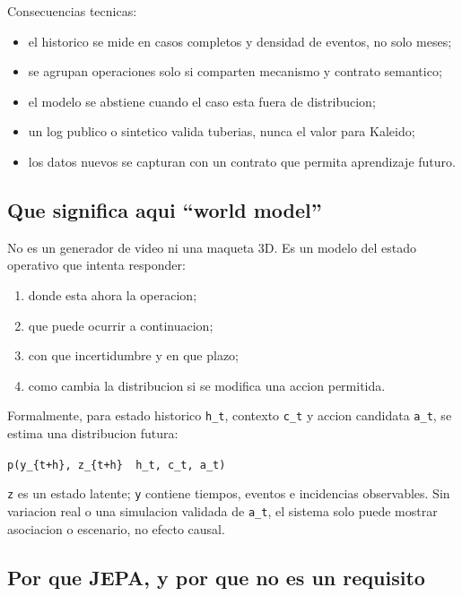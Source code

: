 \documentclass[
  spanish,
  10pt,
  a4paper,
]{article}
\providecommand{\tightlist}{%
  \setlength{\itemsep}{0pt}\setlength{\parskip}{0pt}}
\begin{document}
Consecuencias tecnicas:

\begin{itemize}
\tightlist
\item
  el historico se mide en casos completos y densidad de eventos, no solo
  meses;
\item
  se agrupan operaciones solo si comparten mecanismo y contrato
  semantico;
\item
  el modelo se abstiene cuando el caso esta fuera de distribucion;
\item
  un log publico o sintetico valida tuberias, nunca el valor para
  Kaleido;
\item
  los datos nuevos se capturan con un contrato que permita aprendizaje
  futuro.
\end{itemize}

\subsection{Que significa aqui ``world
model''}\label{que-significa-aqui-world-model}

No es un generador de video ni una maqueta 3D. Es un modelo del estado
operativo que intenta responder:

\begin{enumerate}
\def\labelenumi{\arabic{enumi}.}
\tightlist
\item
  donde esta ahora la operacion;
\item
  que puede ocurrir a continuacion;
\item
  con que incertidumbre y en que plazo;
\item
  como cambia la distribucion si se modifica una accion permitida.
\end{enumerate}

Formalmente, para estado historico \texttt{h\_t}, contexto \texttt{c\_t}
y accion candidata \texttt{a\_t}, se estima una distribucion futura:

\texttt{p(y\_\{t+h\},\ z\_\{t+h\}\ \textbar{}\ h\_t,\ c\_t,\ a\_t)}

\texttt{z} es un estado latente; \texttt{y} contiene tiempos, eventos e
incidencias observables. Sin variacion real o una simulacion validada de
\texttt{a\_t}, el sistema solo puede mostrar asociacion o escenario, no
efecto causal.

\subsection{Por que JEPA, y por que no es un
requisito}\label{por-que-jepa-y-por-que-no-es-un-requisito}
\end{document}
